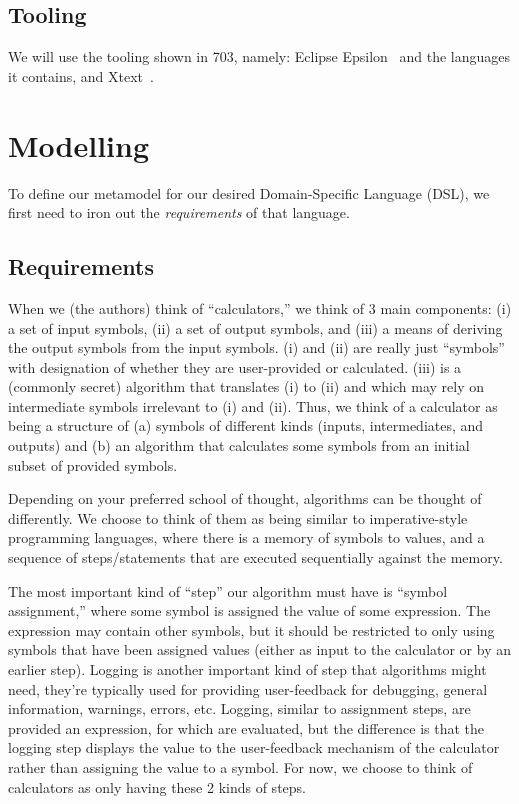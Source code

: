 \documentclass[11pt,fleqn]{article}
\begin{document}
\subsection{Tooling}

We will use the tooling shown in 703, namely: Eclipse Epsilon~\cite{Epsilon} and
the languages it contains, and Xtext~\cite{Xtext}.

\newpage{}

\section{Modelling}
\label{sec:modelling}

To define our metamodel for our desired Domain-Specific Language (DSL), we first
need to iron out the \textit{requirements} of that language.

\subsection{Requirements}
\label{sec:modelling:subsec:requirements}

When we (the authors) think of ``calculators,'' we think of 3 main components:
(i) a set of input symbols, (ii) a set of output symbols, and (iii) a means of
deriving the output symbols from the input symbols. (i) and (ii) are really just
``symbols'' with designation of whether they are user-provided or calculated.
(iii) is a (commonly secret) algorithm that translates (i) to (ii) and which may
rely on intermediate symbols irrelevant to (i) and (ii). Thus, we think of a
calculator as being a structure of (a) symbols of different kinds (inputs,
intermediates, and outputs) and (b) an algorithm that calculates some symbols
from an initial subset of provided symbols.

Depending on your preferred school of thought, algorithms can be thought of
differently. We choose to think of them as being similar to imperative-style
programming languages, where there is a memory of symbols to values, and a
sequence of steps/statements that are executed sequentially against the memory.

The most important kind of ``step'' our algorithm must have is ``symbol
assignment,'' where some symbol is assigned the value of some expression. The
expression may contain other symbols, but it should be restricted to only using
symbols that have been assigned values (either as input to the calculator or by
an earlier step). Logging is another important kind of step that algorithms
might need, they're typically used for providing user-feedback for debugging,
general information, warnings, errors, etc. Logging, similar to assignment
steps, are provided an expression, for which are evaluated, but the difference
is that the logging step displays the value to the user-feedback mechanism of
the calculator rather than assigning the value to a symbol. For now, we choose
to think of calculators as only having these 2 kinds of steps.
\end{document}
